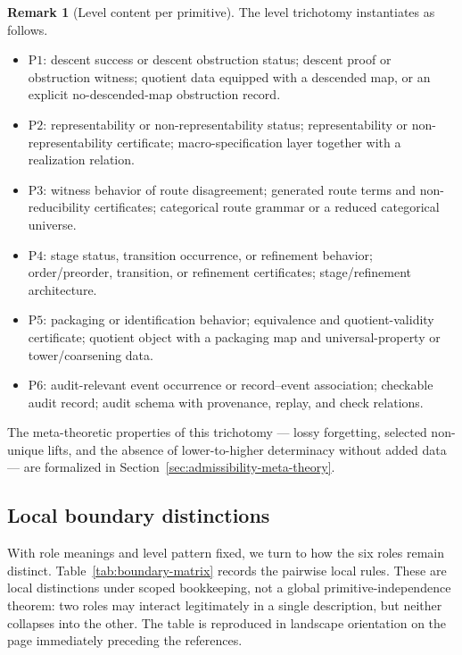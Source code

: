 \documentclass[11pt]{article}
\theoremstyle{definition}
\newtheorem{remark}[theorem]{Remark}
\newcommand{\Pone}{\ensuremath{\mathrm{P1}}}
\newcommand{\Ptwo}{\ensuremath{\mathrm{P2}}}
\newcommand{\Pthree}{\ensuremath{\mathrm{P3}}}
\newcommand{\Pfour}{\ensuremath{\mathrm{P4}}}
\newcommand{\Pfive}{\ensuremath{\mathrm{P5}}}
\newcommand{\Psix}{\ensuremath{\mathrm{P6}}}
\begin{document}
\begin{remark}[Level content per primitive]\label{rem:per-primitive-levels}
The level trichotomy instantiates as follows.
\begin{itemize}[topsep=2pt,itemsep=1pt]
  \item \Pone{}: descent success or descent obstruction status; descent
    proof or obstruction witness; quotient data equipped with a descended
    map, or an explicit no-descended-map obstruction record.
  \item \Ptwo{}: representability or non-representability status;
    representability or non-representability certificate;
    macro-specification layer together with a realization relation.
  \item \Pthree{}: witness behavior of route disagreement; generated route
    terms and non-reducibility certificates; categorical route grammar or a
    reduced categorical universe.
  \item \Pfour{}: stage status, transition occurrence, or refinement
    behavior; order/preorder, transition, or refinement certificates;
    stage/refinement architecture.
  \item \Pfive{}: packaging or identification behavior; equivalence and
    quotient-validity certificate; quotient object with a packaging map
    and universal-property or tower/coarsening data.
  \item \Psix{}: audit-relevant event occurrence or record--event
    association; checkable audit record; audit schema with provenance,
    replay, and check relations.
\end{itemize}
The meta-theoretic properties of this trichotomy --- lossy forgetting,
selected non-unique lifts, and the absence of lower-to-higher determinacy
without added data --- are formalized in
Section~\ref{sec:admissibility-meta-theory}.
\end{remark}

\subsection{Local boundary distinctions}\label{subsec:boundary-matrix}

With role meanings and level pattern fixed, we turn to how the six
roles remain distinct. Table~\ref{tab:boundary-matrix} records the
pairwise local rules. These are local distinctions under scoped
bookkeeping, not a global primitive-independence theorem: two roles
may interact legitimately in a single description, but neither
collapses into the other. The table is reproduced in landscape
orientation on the page immediately preceding the references.
\end{document}
